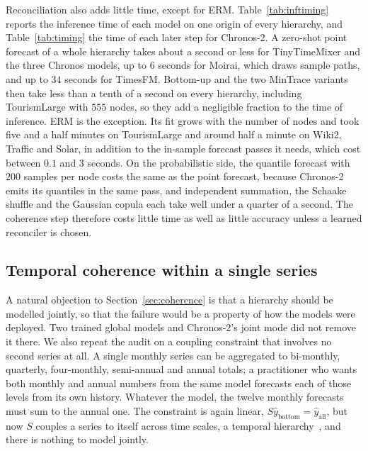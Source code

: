 \documentclass[review,number]{elsarticle}
\begin{document}
Reconciliation also adds little time, except for ERM. Table~\ref{tab:inftiming} reports
the inference time of each model on one origin of every hierarchy, and
Table~\ref{tab:timing} the time of each later step for Chronos-2. A zero-shot point
forecast of a whole hierarchy takes about a second or less for TinyTimeMixer and the
three Chronos models, up to $6$ seconds for Moirai, which draws sample paths, and up to
$34$ seconds for TimesFM. Bottom-up and the two MinTrace variants then take less than a
tenth of a second on every hierarchy, including TourismLarge with $555$ nodes, so they
add a negligible fraction to the time of inference. ERM is the exception. Its fit grows
with the number of nodes and took five and a half minutes on TourismLarge and around
half a minute on Wiki2, Traffic and Solar, in addition to the in-sample forecast passes
it needs, which cost between $0.1$ and $3$ seconds. On the probabilistic side, the
quantile forecast with $200$ samples per node costs the same as the point forecast,
because Chronos-2 emits its quantiles in the same pass, and independent summation, the
Schaake shuffle and the Gaussian copula each take well under a quarter of a second. The
coherence step therefore costs little time as well as little accuracy unless a learned
reconciler is chosen.







\subsection{Temporal coherence within a single series}
\label{sec:temporal}
A natural objection to Section~\ref{sec:coherence} is that a hierarchy should be
modelled jointly, so that the failure would be a property of how the models were
deployed. Two
trained global models and Chronos-2's joint mode did not remove it there. We
also repeat the audit on a coupling constraint that involves no second
series at all. A single monthly series can be aggregated to bi-monthly, quarterly,
four-monthly, semi-annual and annual totals; a practitioner who wants both monthly and
annual numbers from the same model forecasts each of those levels from its own
history. Whatever the model, the twelve monthly forecasts must sum to the annual one.
The constraint is again linear, $S\hat{y}_{\text{bottom}} = \hat{y}_{\text{all}}$, but
now $S$ couples a series to itself across time scales, a temporal
hierarchy~\citep{hfreview2024}, and there is nothing to model
jointly.
\end{document}
